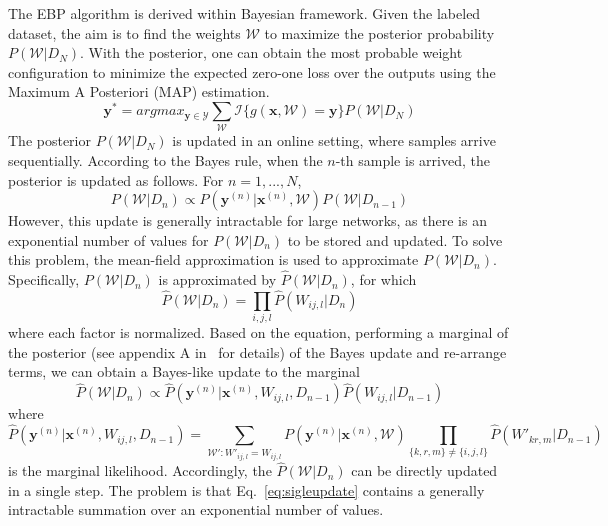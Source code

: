 \documentclass{article} %
\begin{document}
The EBP algorithm is derived within Bayesian framework. Given the labeled dataset, the aim is to find the weights $\mathcal{W}$ to maximize the posterior probability $P(\mathcal{W}|D_N)$. With the posterior, one can obtain the most probable weight configuration to minimize the expected zero-one loss over the outputs using the Maximum A Posteriori (MAP) estimation.
\begin{equation} \label{eq:ebp-p}
    \textbf{y}^* = argmax_{\textbf{y} \in \mathcal{Y}}\sum_{\mathcal{W}}\mathcal{I}\{g(\textbf{x}, \mathcal{W})=\textbf{y}\}P(\mathcal{W}|D_N)
\end{equation}
The posterior $P(\mathcal{W}|D_N)$ is updated in an online setting, where samples arrive sequentially. According to the Bayes rule, when the $n$-th sample is arrived, the posterior is updated as follows. For $n=1, ..., N$,
\begin{equation}
    P(\mathcal{W}|D_n) \propto P(\textbf{y}^{(n)}|\textbf{x}^{(n)}, \mathcal{W})P(\mathcal{W}|D_{n-1})
\end{equation}
However, this update is generally intractable for large networks, as there is an exponential number of values for $P(\mathcal{W}|D_{n})$ to be stored and updated. To solve this problem, the mean-field approximation is used to approximate $P(\mathcal{W}|D_{n})$. Specifically,  $P(\mathcal{W}|D_{n})$ is approximated by $\hat{P}(\mathcal{W}|D_n)$, for which
\begin{equation}
    \hat{P}(\mathcal{W}|D_n) = \prod_{i,j,l}\hat{P}(W_{ij,l}|D_n)
\end{equation}
where each factor is normalized. Based on the equation, performing a marginal of the posterior (see appendix A in~\citet{Soudry14} for details) of the Bayes update and re-arrange terms, we can obtain a Bayes-like update to the marginal
\begin{equation} \label{eq:posup}
\hat{P}(\mathcal{W}|D_n) \propto \hat{P}(\textbf{y}^{(n)}|\textbf{x}^{(n)}, W_{ij,l}, D_{n-1})\hat{P}(W_{ij,l}|D_{n-1})
\end{equation}
where
\begin{equation} \label{eq:sigleupdate}
   \hat{P}(\textbf{y}^{(n)}|\textbf{x}^{(n)}, W_{ij,l}, D_{n-1}) = \sum_{\mathcal{W}':W'_{ij,l}=W_{ij,l}}P(\textbf{y}^{(n)}|\textbf{x}^{(n)},\mathcal{W})\prod_{\{k,r,m\} \neq \{i,j,l\}}\hat{P}(W'_{kr,m}|D_{n-1})
\end{equation}
is the marginal likelihood. Accordingly, the $\hat{P}(\mathcal{W}|D_n)$ can be directly updated in a single step. The problem is that Eq.~\ref{eq:sigleupdate} contains a generally intractable summation over an exponential number of values.
\end{document}

